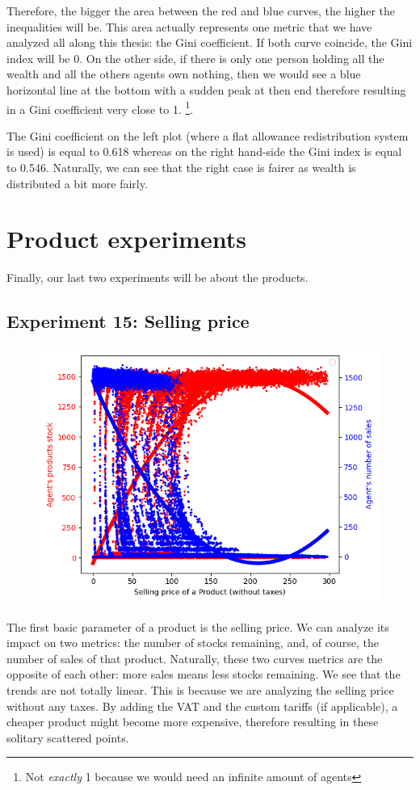 {{{{{{{{{{{{{    Therefore, the bigger the area between the red and blue curves, the higher the inequalities will be. This area actually represents one metric that we have analyzed all along this thesis: the Gini coefficient. If both curve coincide, the Gini index will be 0. On the other side, if there is only one person holding all the wealth and all the others agents own nothing, then we would see a blue horizontal line at the bottom with a sudden peak at then end therefore resulting in a Gini coefficient very close to 1. \footnote{Not \emph{exactly} 1 because we would need an infinite amount of agents}.

    The Gini coefficient on the left plot (where a flat allowance redistribution system is used) is equal to 0.618 whereas on the right hand-side the Gini index is equal to 0.546. Naturally, we can see that the right case is fairer as wealth is distributed a bit more fairly.


\section{Product experiments}
    Finally, our last two experiments will be about the products. 


    \subsection{Experiment 15: Selling price}
    

        \begin{figure}
            \includegraphics[width=\linewidth]{img/exp/15.png}
        \end{figure} 
        { The first basic parameter of a product is the selling price. We can analyze its impact on two metrics: the number of stocks remaining, and, of course, the number of sales of that product. Naturally, these two curves metrics are the opposite of each other: more sales means less stocks remaining. We see that the trends are not totally linear. This is because we are analyzing the selling price without any taxes. By adding the VAT and the custom tariffs (if applicable), a cheaper product might become more expensive, therefore resulting in these solitary scattered points. 
        \par


}}}}}}}}}}}}}}
